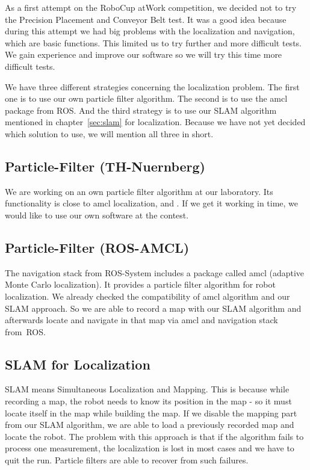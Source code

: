 As a first attempt on the RoboCup atWork  competition, we decided not to try the Precision Placement and Conveyor Belt test. It was a good idea because during this attempt we had big problems with the localization and navigation, which are basic functions. This limited us to try further and more difficult tests. We gain experience and improve our software so we will try this time more difficult tests.

We have three different strategies concerning the localization problem. The first one is to use our own particle filter algorithm. The second is to use the amcl package from ROS. And the third strategy is to use our SLAM algorithm mentioned in chapter~\ref{sec:slam} for localization. Because we have not yet decided which solution to use, we will mention all three in short.

\subsection{Particle-Filter (TH-Nuernberg)}
We are working on an own particle filter algorithm at our laboratory. Its functionality is close to amcl localization, \cite{pf_fox} and \cite{pr}. If we get it working in time, we would like to use our own software at the contest.

\subsection{Particle-Filter (ROS-AMCL)}
The navigation stack from ROS-System includes a package called amcl (adaptive Monte Carlo localization). It provides a particle filter algorithm for robot localization. We already checked the compatibility of amcl algorithm and our SLAM approach. So we are able to record a map with our SLAM algorithm and afterwards locate and navigate in that map via amcl and navigation stack from~ROS.

\subsection{SLAM for Localization}
SLAM means Simultaneous Localization and Mapping. This is because while recording a map, the robot needs to know its position in the map - so it must locate itself in the map while building the map. If we disable the mapping part from our SLAM algorithm, we are able to load a previously recorded map and locate the robot. The problem with this approach is that if the algorithm fails to process one measurement, the localization is lost in most cases and we have to quit the run. Particle filters are able to recover from such failures.